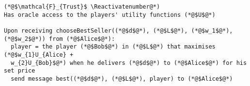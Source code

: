 \Suppressnumber
\begin{lstlisting}[label=trustfunc, style=numbers]
(*@$\mathcal{F}_{Trust}$ \Reactivatenumber@*)
Has oracle access to the players' utility functions (*@$U$@*)

Upon receiving chooseBestSeller((*@$d$@*), (*@$L$@*), (*@$w_1$@*), (*@$w_2$@*)) from (*@$Alice$@*):
  player = the player (*@$Bob$@*) in (*@$L$@*) that maximises (*@$w_{1}U_{Alice} +
  w_{2}U_{Bob}$@*) when he delivers (*@$d$@*) to (*@$Alice$@*) for his set price
  send message best((*@$d$@*), (*@$L$@*), player) to (*@$Alice$@*)
\end{lstlisting}
